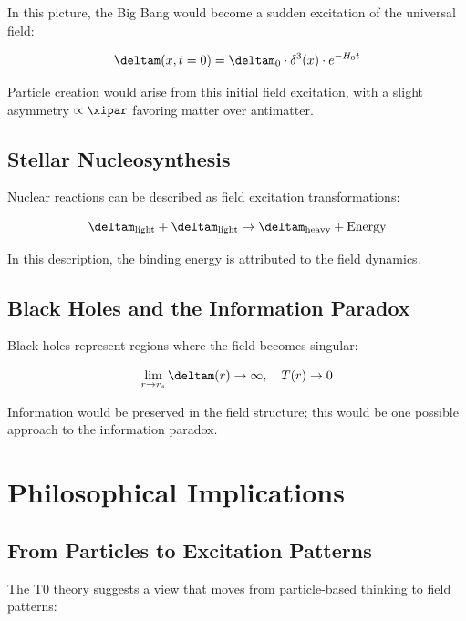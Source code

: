 	In this picture, the Big Bang would become a sudden excitation of the universal field:
	
	\begin{equation}
		\deltam(x,t=0) = \deltam_0 \cdot \delta^3(x) \cdot e^{-H_0 t}
		\label{eq:big_bang_field}
	\end{equation}
	
	Particle creation would arise from this initial field excitation, with a slight asymmetry $\propto \xipar$ favoring matter over antimatter.
	
	\subsection{Stellar Nucleosynthesis}
	
	Nuclear reactions can be described as field excitation transformations:
	
	\begin{equation}
		\deltam_{\text{light}} + \deltam_{\text{light}} \rightarrow \deltam_{\text{heavy}} + \text{Energy}
		\label{eq:nucleosynthesis_field}
	\end{equation}
	
	In this description, the binding energy is attributed to the field dynamics.
	
	\subsection{Black Holes and the Information Paradox}
	
	Black holes represent regions where the field becomes singular:
	
	\begin{equation}
		\lim_{r \to r_s} \deltam(r) \to \infty, \quad T(r) \to 0
		\label{eq:black_hole_singularity}
	\end{equation}
	
	Information would be preserved in the field structure; this would be one possible approach to the information paradox.
	
	\section{Philosophical Implications}
	
	\subsection{From Particles to Excitation Patterns}
	
	The T0 theory suggests a view that moves from particle-based thinking to field patterns:
	
